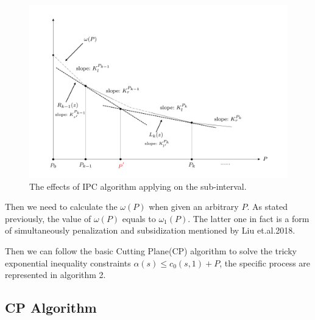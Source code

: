 \begin{figure}[h]%
	\centering  %
	\includegraphics[width=0.9\linewidth]{Figures/IPC}
	\caption{The effects of IPC algorithm applying on the sub-interval.}  %
	\label{fig:ImageIPC}   %
\end{figure}

Then we need to calculate the $\omega(P)$ when given an arbitrary $P$. As stated previously, the value of $\omega(P)$ equals to $\omega_1(P)$. The latter one in fact is a form of simultaneously penalization and subsidization mentioned by Liu et.al.2018.

Then we can follow the basic Cutting Plane(CP) algorithm to solve the tricky exponential inequality constraints $\alpha(s) \leq c_0(s,1)+P$, the specific process are represented in algorithm 2.

\subsection{CP Algorithm}

